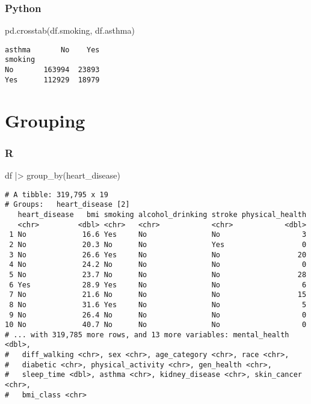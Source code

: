 \documentclass[
  letterpaper,
  DIV=11,
  numbers=noendperiod]{scrreprt}
\newenvironment{Shaded}{\begin{snugshade}}{\end{snugshade}}
\newcommand{\FunctionTok}[1]{\textcolor[rgb]{0.28,0.35,0.67}{#1}}
\newcommand{\NormalTok}[1]{\textcolor[rgb]{0.00,0.46,0.62}{#1}}
\newcommand{\SpecialCharTok}[1]{\textcolor[rgb]{0.37,0.37,0.37}{#1}}
\begin{document}
\hypertarget{python-27}{%
\subsubsection{Python}\label{python-27}}

\begin{Shaded}
\begin{Highlighting}[]
\NormalTok{pd.crosstab(df.smoking, df.asthma)}
\end{Highlighting}
\end{Shaded}

\begin{verbatim}
asthma       No    Yes
smoking               
No       163994  23893
Yes      112929  18979
\end{verbatim}

\hypertarget{grouping}{%
\section{Grouping}\label{grouping}}

\hypertarget{r-28}{%
\subsubsection{R}\label{r-28}}

\begin{Shaded}
\begin{Highlighting}[]
\NormalTok{df }\SpecialCharTok{|\textgreater{}} \FunctionTok{group\_by}\NormalTok{(heart\_disease)}
\end{Highlighting}
\end{Shaded}

\begin{verbatim}
# A tibble: 319,795 x 19
# Groups:   heart_disease [2]
   heart_disease   bmi smoking alcohol_drinking stroke physical_health
   <chr>         <dbl> <chr>   <chr>            <chr>            <dbl>
 1 No             16.6 Yes     No               No                   3
 2 No             20.3 No      No               Yes                  0
 3 No             26.6 Yes     No               No                  20
 4 No             24.2 No      No               No                   0
 5 No             23.7 No      No               No                  28
 6 Yes            28.9 Yes     No               No                   6
 7 No             21.6 No      No               No                  15
 8 No             31.6 Yes     No               No                   5
 9 No             26.4 No      No               No                   0
10 No             40.7 No      No               No                   0
# ... with 319,785 more rows, and 13 more variables: mental_health <dbl>,
#   diff_walking <chr>, sex <chr>, age_category <chr>, race <chr>,
#   diabetic <chr>, physical_activity <chr>, gen_health <chr>,
#   sleep_time <dbl>, asthma <chr>, kidney_disease <chr>, skin_cancer <chr>,
#   bmi_class <chr>
\end{verbatim}
\end{document}
